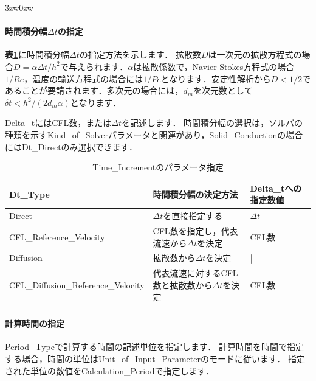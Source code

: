 \begin{indentation}{3zw}{0zw}
%
\paragraph{時間積分幅$\Delta{t}$の指定}
\textbf{表\ref{tbl:delta t inc}}に時間積分幅$\Delta{t}$の指定方法を示します．
拡散数$D$は一次元の拡散方程式の場合$D=\alpha \Delta t \slash h^2$で与えられます．$\alpha$は拡散係数で，Navier-Stokes方程式の場合$1/Re$，温度の輸送方程式の場合には$1/Pe$となります．安定性解析から$D<1 \slash 2$であることが要請されます．多次元の場合には，$d_m$を次元数として$\delta t<h^2 \slash (2d_m \alpha)$となります．

Delta\_tにはCFL数，または$\Delta t$を記述します．
時間積分幅の選択は，ソルバの種類を示すKind\_of\_Solverパラメータと関連があり，Solid\_Conductionの場合にはDt\_Directのみ選択できます．

\begin{table}[htdp]
\caption{Time\_Incrementのパラメータ指定}
\begin{center}
\small
\begin{tabular}{lll} \toprule
Dt\_Type & 時間積分幅の決定方法 & Delta\_tへの指定数値\\ \midrule
Direct & $\Delta t$を直接指定する & $\Delta t$\\
CFL\_Reference\_Velocity & CFL数を指定し，代表流速から$\Delta t$を決定 & CFL数\\
Diffusion & 拡散数から$\Delta t$を決定 & |\\
CFL\_Diffusion\_Reference\_Velocity & 代表流速に対するCFL数と拡散数から$\Delta t$を決定 & CFL数\\
 \bottomrule
\end{tabular}
\end{center}
\label{tbl:delta t inc}
\end{table}



\pagebreak
\paragraph{計算時間の指定}
Period\_Typeで計算する時間の記述単位を指定します．
計算時間を時間で指定する場合，時間の単位は\hyperlink{tgt:unit}{Unit\_of\_Input\_Parameter}のモードに従います．
指定された単位の数値をCalculation\_Periodで指定します．

\end{indentation}



